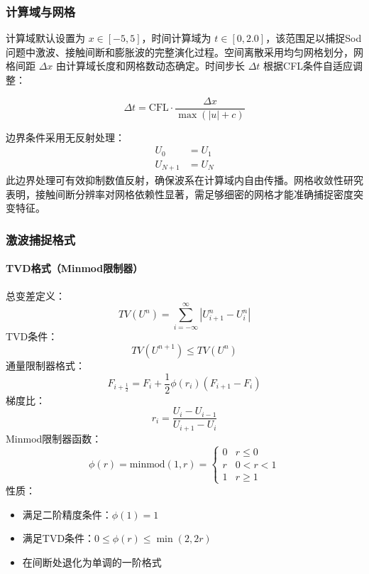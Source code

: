 \documentclass[UTF8]{ctexart}
\begin{document}
\subsubsection{计算域与网格}

计算域默认设置为 $x \in [-5, 5]$，时间计算域为 $t \in [0, 2.0]$，该范围足以捕捉Sod问题中激波、接触间断和膨胀波的完整演化过程。空间离散采用均匀网格划分，网格间距 $\Delta x$ 由计算域长度和网格数动态确定。时间步长 $\Delta t$ 根据CFL条件自适应调整：

\begin{equation}
\Delta t = \text{CFL} \cdot \frac{\Delta x}{\max(|u| + c)}
\end{equation}

边界条件采用无反射处理：
\begin{align*}
U_0 &= U_1 \\
U_{N+1} &= U_N
\end{align*}
此边界处理可有效抑制数值反射，确保波系在计算域内自由传播。网格收敛性研究表明，接触间断分辨率对网格依赖性显著，需足够细密的网格才能准确捕捉密度突变特征。

\subsubsection{激波捕捉格式}
\paragraph{TVD格式（Minmod限制器）}
\cite{harten1983}
总变差定义：
\begin{equation}
TV(U^n) = \sum_{i=-\infty}^{\infty} |U_{i+1}^n - U_i^n|
\end{equation}
TVD条件：
\begin{equation}
TV(U^{n+1}) \leq TV(U^n)
\end{equation}
通量限制器格式：
\begin{equation}
F_{i+\frac{1}{2}} = F_i + \frac{1}{2} \phi(r_i) (F_{i+1} - F_i)
\end{equation}
梯度比：
\begin{equation}
r_i = \frac{U_i - U_{i-1}}{U_{i+1} - U_i}
\end{equation}
Minmod限制器函数：
\begin{equation}
\phi(r) = \text{minmod}(1, r) = 
\begin{cases} 
0 & r \leq 0 \\
r & 0 < r < 1 \\
1 & r \geq 1 
\end{cases}
\end{equation}
性质：
\begin{itemize}
\item 满足二阶精度条件：$\phi(1)=1$
\item 满足TVD条件：$0 \leq \phi(r) \leq \min(2,2r)$
\item 在间断处退化为单调的一阶格式
\end{itemize}
\end{document}
